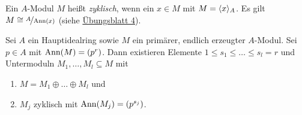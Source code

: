 \documentclass[12pt,a4paper]{scrartcl}
\theoremstyle{cplain}
\theoremstyle{cdef}
\begin{document}
\begin{defi}
	Ein $A$-Modul $M$ heißt \emph{zyklisch}, wenn ein $x\in M$ mit $M = \langle x\rangle_A$. Es gilt $M\cong \nicefrac{A}{\operatorname{Ann}(x)}$ (siehe \href{http://www.math.uni-bonn.de/ag/stroppel/Franzen_Algebra_1_Uebung/Blatt4.pdf}{Übungsblatt 4}).
\end{defi}

\begin{satz} \label{thm:zerlegung primaer zyklisch}
	Sei $A$ ein Hauptidealring sowie $M$ ein primärer, endlich erzeugter $A$-Modul. Sei $p\in A$ mit $\operatorname{Ann}(M) = (p^r)$. Dann existieren Elemente $1\le s_1\le\dots \le s_l = r$ und  Untermoduln $M_1,\dots, M_l\subseteq M$ mit
	\begin{enumerate}
		\item $M = M_1\oplus\dots\oplus M_l$ und
		\item $M_j$ zyklisch mit $\operatorname{Ann}(M_j) =(p^{s_j})$.
	\end{enumerate}
\end{satz}
\end{document}
